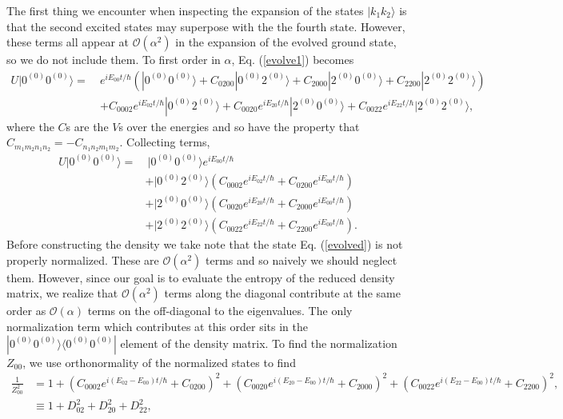 \documentclass[aps,showpacs,onecolumn,floats,prd,superscriptaddress,nofootinbib]{revtex4-1}
\begin{document}
The first thing we encounter when inspecting the expansion of the states $|k_1k_2\rangle$ is that the second excited states may superpose with the the fourth state. However, these terms all appear at $\mathcal{O}(\alpha^2)$ in the expansion of the evolved ground state, so we do not include them. To first order in $\alpha$, Eq. (\ref{evolve1}) becomes
\begin{align}
U | 0^{(0)} 0^{(0)} \rangle =~& e^{iE_{00}t/\hbar}\left( | 0^{(0)} 0^{(0)} \rangle +  C_{0200}| 0^{(0)} 2^{(0)} \rangle +  C_{2000}| 2^{(0)} 0^{(0)} \rangle +   C_{2200}| 2^{(0)} 2^{(0)} \rangle \right) \nonumber
\\ &+ C_{0002} e^{iE_{02}t/\hbar} | 0^{(0)} 2^{(0)} \rangle + C_{0020} e^{iE_{20}t/\hbar} | 2^{(0)} 0^{(0)} \rangle + C_{0022} e^{iE_{22}t/\hbar} | 2^{(0)} 2^{(0)} \rangle,
\end{align}
where the $C$s are the $V$s over the energies and so have the property that $C_{m_1m_2n_1n_2} = -C_{n_1n_2m_1m_2}$. Collecting terms,
\begin{align}
U | 0^{(0)} 0^{(0)} \rangle =&~| 0^{(0)} 0^{(0)} \rangle e^{iE_{00}t/\hbar}
\nonumber \\&+ | 0^{(0)} 2^{(0)} \rangle \left( C_{0002} e^{iE_{02}t/\hbar} + C_{0200} e^{iE_{00}t/\hbar}  \right)
\nonumber \\&+ | 2^{(0)} 0^{(0)} \rangle \left( C_{0020} e^{iE_{20}t/\hbar} + C_{2000} e^{iE_{00}t/\hbar} \right)
\nonumber \\&+ | 2^{(0)} 2^{(0)} \rangle \left( C_{0022} e^{iE_{22}t/\hbar} + C_{2200} e^{iE_{00}t/\hbar}\right). \label{evolved}
\end{align}
Before constructing the density we take note that the state Eq. (\ref{evolved}) is not properly normalized. These are $\mathcal{O}(\alpha^2)$ terms and so naively we should neglect them. However, since our goal is to evaluate the entropy of the reduced density matrix, we realize that $\mathcal{O}(\alpha^2)$ terms along the diagonal contribute at the same order as $\mathcal{O}(\alpha)$ terms on the off-diagonal to the eigenvalues. The only normalization term which contributes at this order sits in the $| 0^{(0)} 0^{(0)} \rangle \langle 0^{(0)} 0^{(0)} |$ element of the density matrix. To find the normalization $Z_{00}$, we use orthonormality of the normalized states to find
\begin{align}
\frac{1}{Z_{00}^2} &= 1 + \left( C_{0002} e^{i(E_{02}-E_{00})t/\hbar} + C_{0200} \right)^2
+ \left( C_{0020} e^{i(E_{20}-E_{00})t/\hbar} + C_{2000} \right)^2
+ \left( C_{0022} e^{i(E_{22}-E_{00})t/\hbar} + C_{2200} \right)^2, \label{normalization}
\\ \nonumber &\equiv 1 + D_{02}^2 + D_{20}^2 + D_{22}^2,
\end{align}
\end{document}

